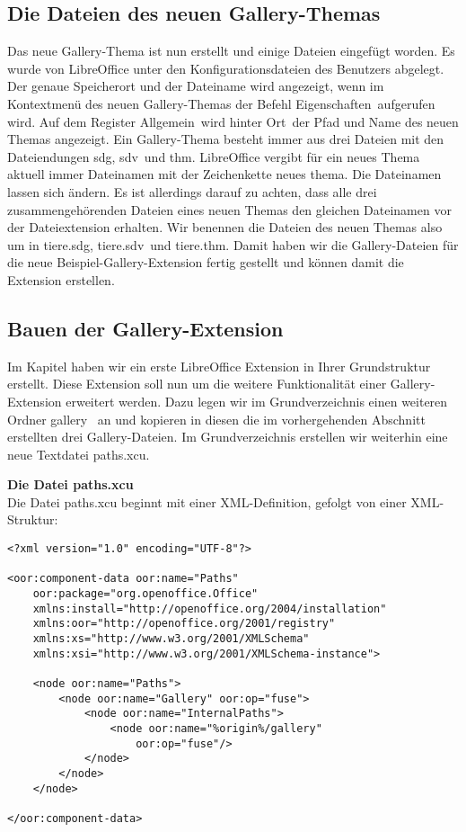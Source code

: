 \documentclass[a4paper,10pt,pagesize,titlepage]{scrbook}
\begin{document}
\subsection{Die Dateien des neuen Gallery-Themas}

Das neue Gallery-Thema ist nun erstellt und einige Dateien eingefügt worden. Es wurde von LibreOffice unter den Konfigurationsdateien des Benutzers abgelegt. Der genaue Speicherort und der Dateiname wird angezeigt, wenn im Kontextmenü des neuen Gallery-Themas der Befehl \glqq Eigenschaften\grqq~aufgerufen wird. Auf dem Register \glqq Allgemein\grqq~wird hinter \glqq Ort\grqq~der Pfad und Name des neuen Themas angezeigt. Ein Gallery-Thema besteht immer aus drei Dateien mit den Dateiendungen \glqq sdg\grqq, \glqq sdv\grqq~und \glqq thm\grqq. LibreOffice vergibt für ein neues Thema aktuell immer Dateinamen mit der Zeichenkette \glqq neues thema\grqq. Die Dateinamen lassen sich ändern. Es ist allerdings darauf zu achten, dass alle drei zusammengehörenden Dateien eines neuen Themas den gleichen Dateinamen vor der Dateiextension erhalten. Wir benennen die Dateien des neuen Themas also um in \glqq tiere.sdg\grqq, \glqq tiere.sdv\grqq~und \glqq tiere.thm\grqq. Damit haben wir die Gallery-Dateien für die neue Beispiel-Gallery-Extension fertig gestellt und können damit die Extension erstellen.

\subsection{Bauen der Gallery-Extension}

Im Kapitel  haben wir ein erste LibreOffice Extension in Ihrer Grundstruktur erstellt. Diese Extension soll nun um die weitere Funktionalität einer Gallery-Extension erweitert werden. Dazu legen wir im Grundverzeichnis einen weiteren Ordner \glqq gallery\grqq~ an und kopieren in diesen die im vorhergehenden Abschnitt erstellten drei Gallery-Dateien. Im Grundverzeichnis erstellen wir weiterhin eine neue Textdatei \glqq paths.xcu\grqq.

\bigskip\textbf{Die Datei paths.xcu}
\\

Die Datei paths.xcu beginnt mit einer XML-Definition, gefolgt von einer XML-Struktur:

\begin{lstlisting}
<?xml version="1.0" encoding="UTF-8"?>

<oor:component-data oor:name="Paths" 
    oor:package="org.openoffice.Office" 
    xmlns:install="http://openoffice.org/2004/installation" 
    xmlns:oor="http://openoffice.org/2001/registry"
    xmlns:xs="http://www.w3.org/2001/XMLSchema" 
    xmlns:xsi="http://www.w3.org/2001/XMLSchema-instance">
    
    <node oor:name="Paths">
        <node oor:name="Gallery" oor:op="fuse">
    	    <node oor:name="InternalPaths">
    	        <node oor:name="%origin%/gallery" 
    	            oor:op="fuse"/>
    	    </node>
    	</node>
    </node>
    
</oor:component-data>
\end{lstlisting}
\end{document}
